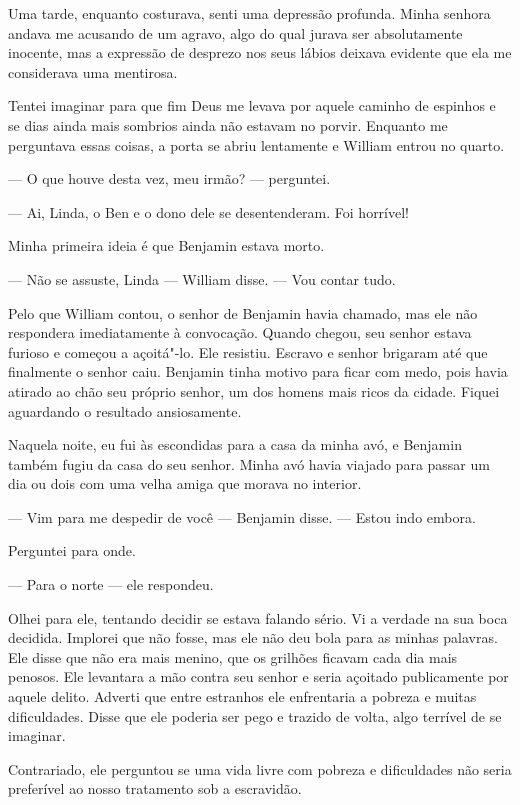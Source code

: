 Uma tarde, enquanto costurava, senti
uma depressão profunda. Minha senhora andava me acusando de um agravo,
algo do qual jurava ser absolutamente inocente, mas a expressão de
desprezo nos seus lábios deixava evidente que ela me considerava uma
mentirosa.

Tentei imaginar para que fim Deus me
levava por aquele caminho de espinhos e se dias ainda mais sombrios
ainda não estavam no porvir. Enquanto me perguntava essas coisas, a
porta se abriu lentamente e William entrou no quarto.

--- O que houve desta vez, meu irmão? --- perguntei.

--- Ai, Linda, o Ben e o dono dele se
desentenderam. Foi horrível!

Minha primeira ideia é que Benjamin
estava morto.

--- Não se assuste, Linda --- William disse. --- Vou contar tudo.

Pelo que William contou, o senhor de
Benjamin havia chamado, mas ele não respondera imediatamente à
convocação. Quando chegou, seu senhor estava furioso e começou a
açoitá"-lo. Ele resistiu. Escravo e senhor brigaram até que finalmente o
senhor caiu. Benjamin tinha motivo para ficar com medo, pois havia
atirado ao chão seu próprio senhor, um dos homens mais ricos da cidade.
Fiquei aguardando o resultado ansiosamente.

Naquela noite, eu fui às escondidas
para a casa da minha avó, e Benjamin também fugiu da casa do seu senhor.
Minha avó havia viajado para passar um dia ou dois com uma velha amiga
que morava no interior.

--- Vim para me despedir de você ---
Benjamin disse. --- Estou indo embora.

Perguntei para onde.

--- Para o norte --- ele respondeu.

Olhei para ele, tentando decidir se
estava falando sério. Vi a verdade na sua boca decidida. Implorei que
não fosse, mas ele não deu bola para as minhas palavras. Ele disse que
não era mais menino, que os grilhões ficavam cada dia mais penosos. Ele
levantara a mão contra seu senhor e seria açoitado publicamente por
aquele delito. Adverti que entre estranhos ele enfrentaria a pobreza e
muitas dificuldades. Disse que ele poderia ser pego e trazido de volta,
algo terrível de se imaginar.

Contrariado, ele perguntou se uma vida
livre com pobreza e dificuldades não seria preferível ao nosso
tratamento sob a escravidão.

